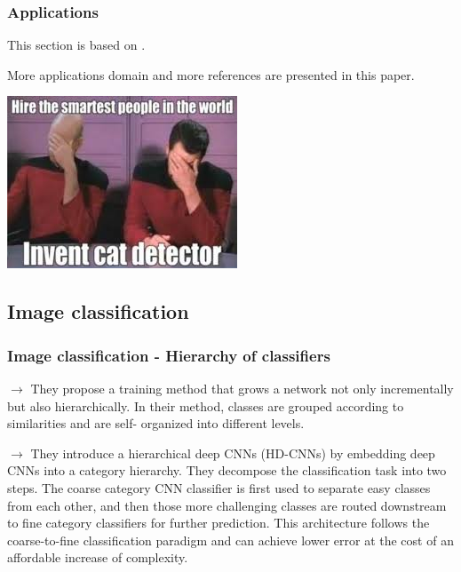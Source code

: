 \begin{frame}
	\frametitle{Applications}
	This section is based on .

	\bigskip

	More applications domain and more references are presented in this paper.

	\bigskip

	\medskip

	\begin{center}
		\includegraphics[scale=0.6]{figs/cat_detector}
	\end{center}


\end{frame}
\subsection{Image classification}



\begin{frame}
\frametitle{Image classification - Hierarchy of classifiers}






\smallskip
$\rightarrow$ They propose a training method that grows a network not only incrementally but also hierarchically. In their method, classes are grouped according to similarities and are self- organized into different levels.

\bigskip



\smallskip
$\rightarrow$ They introduce a hierarchical deep CNNs (HD-CNNs) by embedding deep CNNs into a category hierarchy. They decompose the classification task into two steps. The coarse category CNN classifier is first used to separate easy classes from each other, and then those more challenging classes are routed downstream to fine category classifiers for further prediction. This architecture follows the coarse-to-fine classification paradigm and can achieve lower error at the cost of an affordable increase of complexity.



\end{frame}




